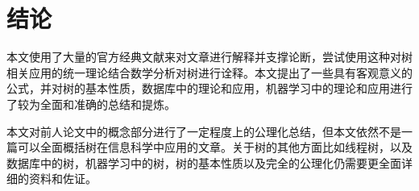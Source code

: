 
\chapter{结论}
	本文使用了大量的官方经典文献来对文章进行解释并支撑论断，尝试使用这种对树相关应用的统一理论结合数学分析对树进行诠释。本文提出了一些具有客观意义的公式，并对树的基本性质，数据库中的理论和应用，机器学习中的理论和应用进行了较为全面和准确的总结和提炼。

	本文对前人论文中的概念部分进行了一定程度上的公理化总结，但本文依然不是一篇可以全面概括树在信息科学中应用的文章。关于树的其他方面比如线程树，以及数据库中的树，机器学习中的树，树的基本性质以及完全的公理化仍需要更全面详细的资料和佐证。